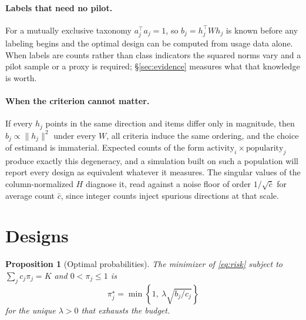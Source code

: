 \documentclass[11pt]{article}
\theoremstyle{plain}
\newtheorem{proposition}{Proposition}
\theoremstyle{remark}
\begin{document}
\paragraph{Labels that need no pilot.} For a mutually exclusive taxonomy $a_j^\top a_j=1$, so $b_j=h_j^\top W h_j$ is known before any labeling begins and the optimal design can be computed from usage data alone. When labels are counts rather than class indicators the squared norms vary and a pilot sample or a proxy is required; \S\ref{sec:evidence} measures what that knowledge is worth.

\paragraph{When the criterion cannot matter.} If every $h_j$ points in the same direction and items differ only in magnitude, then $b_j\propto\|h_j\|^2$ under every $W$, all criteria induce the same ordering, and the choice of estimand is immaterial. Expected counts of the form $\text{activity}_i\times\text{popularity}_j$ produce exactly this degeneracy, and a simulation built on such a population will report every design as equivalent whatever it measures. The singular values of the column-normalized $H$ diagnose it, read against a noise floor of order $1/\sqrt{\bar c}$ for average count $\bar c$, since integer counts inject spurious directions at that scale.

\section{Designs}

\begin{proposition}[Optimal probabilities]
\label{prop:pps}
The minimizer of \eqref{eq:risk} subject to $\sum_jc_j\pi_j=K$ and $0<\pi_j\le1$ is
\begin{equation}
\label{eq:pps}
\pi_j^\star=\min\!\left\{1,\ \lambda\sqrt{b_j/c_j}\right\}
\end{equation}
for the unique $\lambda>0$ that exhausts the budget.
\end{proposition}
\end{document}
